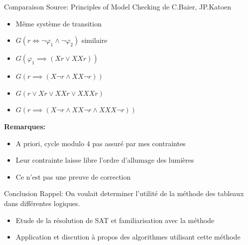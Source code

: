 \documentclass{beamer}
\begin{document}
\begin{frame}{Comparaison}
    Source: Principles of Model Checking de C.Baier, JP.Katoen
    \begin{itemize}
        \item Même système de transition
        \item $G(r\Leftrightarrow\lnot\varphi_1\land\lnot\varphi_2)$ similaire
        \item $G(\varphi_1 \implies(Xr \lor XXr))$
        \item $G(r\implies (X\lnot r \land  XX\lnot r))$
        \item $G(r\lor Xr\lor XXr \lor XXXr)$
        \item $G(r\implies(X\lnot r \land XX\lnot r \land XXX \lnot r))$
    \end{itemize}
    \pause
    \textbf{Remarques:}
    \begin{itemize}
        \item A priori, cycle modulo 4 pas assuré par mes contraintes
        \item Leur contrainte laisse libre l'ordre d'allumage des lumières
        \item Ce n'est pas une preuve de correction
    \end{itemize}
\end{frame}

\begin{frame}{Conclusion}
    Rappel: On voulait determiner l'utilité de la méthode des tableaux dans différentes logiques.
    \begin{itemize}
        \item Etude de la résolution de SAT et familiarisation avec la méthode 
        \item Application et discution à propos des algorithmes utilisant cette méthode
    \end{itemize}
\end{frame}

\inputminted[]{ocaml}{Code/Alternee_Tableau.ml}
\inputminted[]{python}{Code/PropGenerator.py}
\inputminted[]{ocaml}{Code/quine.ml}
\end{document}
